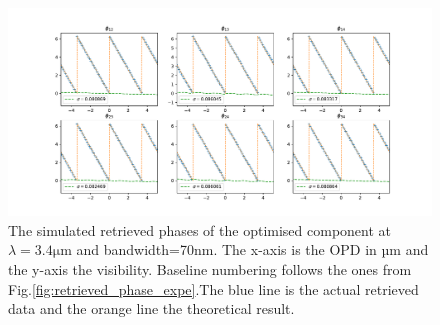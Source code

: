 \documentclass[a4paper,twoside,11pt]{article}
\begin{document}
    \begin{figure}[htbp!]
     \centering
     \includegraphics[scale=.4]{../picture/retrieve_phase_simu.pdf}
     \caption{The simulated retrieved phases of the optimised component at $\lambda=3.4\si{\micro\meter}$ and bandwidth=70nm. The x-axis is the OPD in µm and the y-axis the visibility. Baseline numbering follows the ones from Fig.\ref{fig:retrieved_phase_expe}.The blue line is the actual retrieved data and the orange line the theoretical result.}
     \label{an:retrieved_phase_simu}
    \end{figure}

\newpage
\printglossary

\newpage


\end{document}

